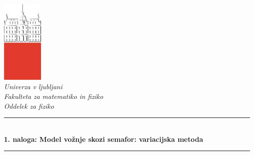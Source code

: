 \documentclass[11pt]{article}
\numberwithin{equation}{section} %
\numberwithin{table}{section} %
\begin{document}


\begin{titlepage}

\newcommand{\HRule}{\rule{\linewidth}{0.5mm}} %

\center %


 

\includegraphics[width=2cm]{slike/aaa}\\[0.5cm]
 
\textit{Univerza v ljubljani}\\
\textit{Fakulteta za {\color{red}matematiko in fiziko}}\\[0.5cm]

\emph{Oddelek za fiziko}\\[0.5cm] %


\HRule \\[0.4cm]
\huge {\bfseries 1. naloga: Model vožnje skozi semafor: variacijska metoda}\\[0.4cm] %
\HRule \\[0.5cm] 


\end{titlepage}
\end{document}
